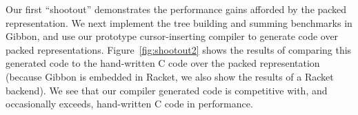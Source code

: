 \documentclass[a4paper,english]{lipics-v2016}
\newcommand{\treelang}{Gibbon\xspace} %
\begin{document}
Our first ``shootout'' demonstrates the performance gains afforded by the
packed representation. We next implement the tree building and summing
benchmarks in \treelang{}, and use our prototype cursor-inserting compiler to
generate code over packed representations. Figure~\ref{fig:shootout2} shows
the results of comparing this generated code to the hand-written C code over
the packed representation (because \treelang{} is embedded in Racket, we also
show the results of a Racket backend). We see that our compiler generated code
is competitive with, and occasionally exceeds, hand-written C code in
performance.


% 
% 
% 
\end{document}
